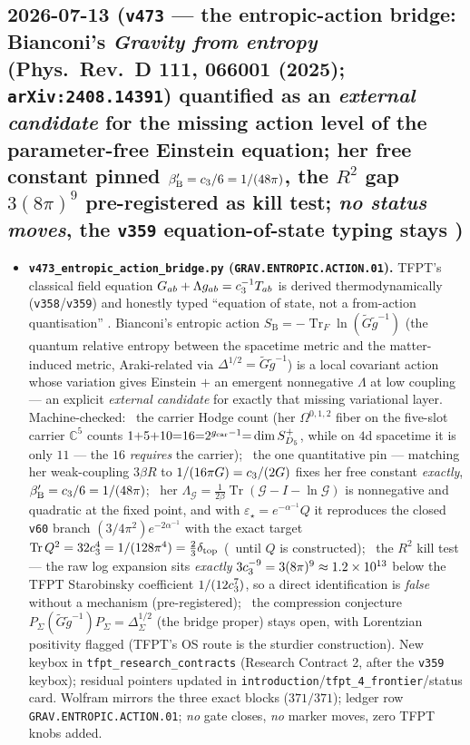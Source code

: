 \subsection*{2026-07-13 (\texttt{v473} --- the entropic-action bridge: Bianconi's \emph{Gravity from entropy} (Phys.\ Rev.\ D 111, 066001 (2025); \texttt{arXiv:2408.14391}) quantified as an \emph{external candidate} for the missing action level of the parameter-free Einstein equation; her free constant pinned $\beta'_{\mathrm B}=c_3/6=1/(48\pi)$, the $R^2$ gap $3(8\pi)^9$ pre-registered as kill test; \emph{no status moves}, the \texttt{v359} equation-of-state typing stays \mO)}
\begin{itemize}[leftmargin=1.5em]
\item \textbf{\texttt{v473\_entropic\_action\_bridge.py} (\texttt{GRAV.ENTROPIC.ACTION.01}).} TFPT's
classical field equation $G_{ab}+\Lambda g_{ab}=c_3^{-1}T_{ab}$ is derived thermodynamically
(\texttt{v358}/\texttt{v359}) and honestly typed ``equation of state, not a from-action quantisation''
\mO. Bianconi's entropic action $S_{\mathrm B}=-\operatorname{Tr}_F\ln(\widetilde G\widetilde g^{-1})$
(the quantum relative entropy between the spacetime metric and the matter-induced metric, Araki-related
via $\Delta^{1/2}=\widetilde G\widetilde g^{-1}$) is a local covariant action whose variation gives
Einstein $+$ an emergent nonnegative $\Lambda$ at low coupling --- an explicit \emph{external candidate}
for exactly that missing variational layer. Machine-checked: \mE\ the carrier Hodge count (her
$\Omega^{0,1,2}$ fiber on the five-slot carrier $\mathbb C^5$ counts $1{+}5{+}10{=}16{=}2^{g_{\mathrm{car}}-1}
{=}\dim S^+_{D_5}$, while on $4$d spacetime it is only $11$ --- the $16$ \emph{requires} the carrier);
\mE\ the one quantitative pin --- matching her weak-coupling $3\beta R$ to $1/(16\pi G)=c_3/(2G)$
fixes her free constant \emph{exactly}, $\beta'_{\mathrm B}=c_3/6=1/(48\pi)$; \mE\ her
$\Lambda_{\mathcal G}=\tfrac1{2\beta}\operatorname{Tr}(\mathcal G-I-\ln\mathcal G)$ is nonnegative and
quadratic at the fixed point, and with $\varepsilon_\star=e^{-\alpha^{-1}}Q$ it reproduces the closed
\texttt{v60} branch $(3/4\pi^2)e^{-2\alpha^{-1}}$ with the exact target $\operatorname{Tr}Q^2=
32c_3^4=1/(128\pi^4)=\tfrac23\delta_{\mathrm{top}}$ (\mC\ until $Q$ is constructed); \mE\ the
$R^2$ kill test --- the raw log expansion sits \emph{exactly} $3c_3^{-9}=3(8\pi)^9\approx
1.2\times10^{13}$ below the TFPT Starobinsky coefficient $1/(12c_3^7)$, so a direct identification
is \emph{false} without a mechanism (pre-registered); \mC\ the compression conjecture
$P_\Sigma(\widetilde G\widetilde g^{-1})P_\Sigma=\Delta_\Sigma^{1/2}$ (the bridge proper) stays open,
with Lorentzian positivity flagged (TFPT's OS route is the sturdier construction). New keybox in
\texttt{tfpt\_research\_contracts} (Research Contract 2, after the \texttt{v359} keybox); residual
pointers updated in \texttt{introduction}/\texttt{tfpt\_4\_frontier}/status card. Wolfram mirrors the
three exact blocks ($371/371$); ledger row \texttt{GRAV.ENTROPIC.ACTION.01}; \emph{no} gate closes,
\emph{no} marker moves, zero TFPT knobs added.
\end{itemize}

